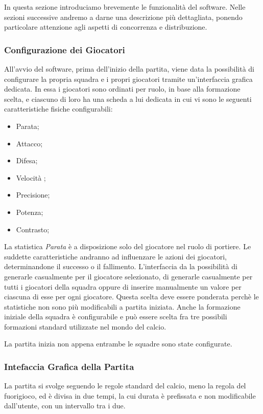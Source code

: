 In questa sezione introduciamo brevemente le funzionalit\`{a} del software. Nelle sezioni successive andremo a darne una descrizione pi\`{u} dettagliata, ponendo particolare attenzione agli aspetti di concorrenza e distribuzione.

\subsubsection*{Configurazione dei Giocatori}
%
\label{sec:conf_giocatori}
All'avvio del software, prima dell'inizio della partita, viene data la possibilit\`{a} di configurare la propria squadra e i propri giocatori tramite un'interfaccia grafica dedicata. In essa i giocatori sono ordinati per ruolo, in base alla formazione scelta, e ciascuno di loro ha una scheda a lui dedicata in cui vi sono le seguenti caratteristiche fisiche configurabili:
\begin{itemize}
\item Parata;
\item Attacco;
\item Difesa;
\item Velocit\`{a} ;
\item Precisione;
\item Potenza;
\item Contrasto;
\end{itemize}
\noindent La statistica \emph{Parata} \`{e} a disposizione solo del giocatore nel ruolo di portiere. Le suddette caratteristiche andranno ad influenzare le azioni dei giocatori, determinandone il successo o il fallimento. L'interfaccia da la possibilit\`{a} di generarle casualmente per il giocatore selezionato, di generarle casualmente per tutti i giocatori della squadra oppure di inserire manualmente un valore per ciascuna di esse per ogni giocatore. Questa scelta deve essere ponderata perch\`{e} le statistiche non sono pi\`{u} modificabili a partita iniziata. Anche la formazione iniziale della squadra \`{e} configurabile e pu\`{o} essere scelta fra tre possibili formazioni standard utilizzate nel mondo del calcio.

La partita inizia non appena entrambe le squadre sono state configurate.

\subsubsection*{Intefaccia Grafica della Partita}
%
\label{sec:gui_partita}
La partita si svolge seguendo le regole standard del calcio, meno la regola del fuorigioco, ed \`{e} divisa in due tempi, la cui durata \`{e} prefissata e non modificabile dall'utente, con un intervallo tra i due.

